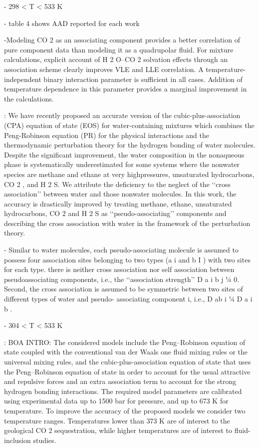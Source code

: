 - 298 < T < 533 K

- table 4 shows AAD reported for each work

-Modeling CO 2 as an associating component provides a better correlation of pure component data than modeling it as a quadrupolar fluid. For mixture calculations, explicit account of H 2 O–CO 2 solvation effects through an association scheme clearly improves VLE and LLE correlation. A temperature-independent binary interaction parameter is sufficient in all cases. Addition of temperature dependence in this parameter provides a marginal
improvement in the calculations.




\cite{Li2009}: We have recently proposed an accurate version of the cubic-plus-association (CPA) equation of state (EOS) for water-containing mixtures which combines the Peng-Robinson equation (PR) for the physical interactions and the thermodynamic perturbation theory for the hydrogen bonding of water molecules. Despite the signiﬁcant improvement, the water composition in the nonaqueous phase is systematically underestimated for some systems where the nonwater species are methane and ethane at very highpressures, unsaturated hydrocarbons, CO 2 , and H 2 S. We attribute the deﬁciency to the neglect of the ‘‘cross association’’ between water and those nonwater molecules. In
this work, the accuracy is drastically improved by treating methane, ethane, unsaturated hydrocarbons, CO 2 and H 2 S as ‘‘pseudo-associating’’ components and describing the cross association with water in the framework of the perturbation theory.

- Similar to water molecules, each pseudo-associating molecule is assumed to possess four association sites belonging to two types (a i and b I ) with two sites for each type. there is neither cross association nor self association between pseudoassociating components, i.e., the ‘‘association strength’’ D a i b j ¼ 0. Second, the cross association is assumed to be symmetric between two sites of different types of water and pseudo-
associating component i, i.e., D ab i ¼ D a i b .

- 304 < T < 533 K



 \cite{Pappa2009}: BOA INTRO: The considered models include the Peng–Robinson equation of state coupled with the conventional van der Waals one ﬂuid mixing rules or the universal mixing rules, and the cubic-plus-association equation of state that uses the Peng–Robinson equation of state in order to account for the usual attractive and repulsive forces and an extra association term to account for the strong hydrogen bonding interactions. The required model parameters are calibrated using experimental data up to 1500 bar for pressure, and up to 673 K for temperature. To improve the accuracy of the proposed models we consider two temperature ranges. Temperatures lower than 373 K are of interest to the geological CO 2 sequestration, while higher temperatures are of interest to ﬂuid-inclusion studies.

